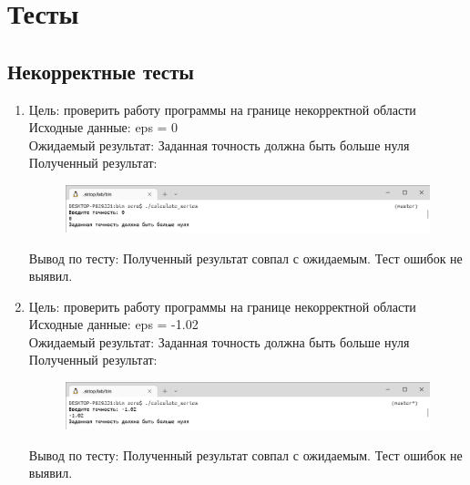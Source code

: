 \documentclass[a4paper]{article}
\begin{document}
	\section{Тесты}
	\subsection{Некорректные тесты}
	
	\begin{enumerate}[label=\textbf{Тест \arabic*}]
		\item Цель: проверить работу программы на границе некорректной области \\
		Исходные данные: eps = 0 \\
		Ожидаемый результат: Заданная точность должна быть больше нуля \\
		Полученный результат:
		
		\begin{figure}[h]
			\includegraphics[width=\textwidth,trim=0.5mm 0 0 0.5mm,clip]{tests/test0.png}
		\end{figure}
	
		Вывод по тесту: Полученный результат совпал с ожидаемым. Тест ошибок не выявил.
		\vspace{5mm}
		
		\item Цель: проверить работу программы на границе некорректной области \\
		Исходные данные: eps = -1.02 \\
		Ожидаемый результат: Заданная точность должна быть больше нуля \\
		Полученный результат:
		
		\begin{figure}[h]
			\includegraphics[width=\textwidth,trim=0.5mm 0 0 0.5mm,clip]{tests/test-1.02.png}
		\end{figure}
	
		Вывод по тесту: Полученный результат совпал с ожидаемым. Тест ошибок не выявил.
	\end{enumerate}
	
\end{document}
